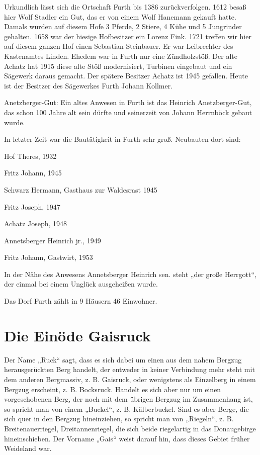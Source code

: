 \documentclass[12pt,a4pager]{book}
\begin{document}
Urkundlich lässt sich die Ortschaft Furth bis 1386 zurückverfolgen. 1612 besaß
hier Wolf Stadler ein Gut, das er von einem Wolf Hanemann gekauft hatte. Damals
wurden auf diesem Hofe 3 Pferde, 2 Stiere, 4 Kühe und 5 Jungrinder gehalten.
1658 war der hiesige Hofbesitzer ein Lorenz Fink. 1721 treffen wir hier auf
diesem ganzen Hof einen Sebastian Steinbauer. Er war Leibrechter des Kastenamtes
Linden. Ehedem war in Furth nur eine Zündholzstöß. Der alte Achatz hat 1915
diese alte Stöß modernisiert, Turbinen eingebaut und ein Sägewerk daraus
gemacht. Der spätere Besitzer Achatz ist 1945 gefallen. Heute ist der Besitzer
des Sägewerkes Furth Johann Kollmer.

Anetzberger-Gut: Ein altes Anwesen in Furth ist das Heinrich Anetzberger-Gut,
das schon 100 Jahre alt sein dürfte und seinerzeit von Johann Herrnböck gebaut
wurde.

In letzter Zeit war die Bautätigkeit in Furth sehr groß. Neubauten dort sind:

Hof Theres, 1932

Fritz Johann, 1945

Schwarz Hermann, Gasthaus zur Waldesrast 1945

Fritz Joseph, 1947

Achatz Joseph, 1948

Annetsberger Heinrich jr., 1949

Fritz Johann, Gastwirt, 1953

In der Nähe des Anwesens Annetsberger Heinrich sen. steht „der große Herrgott“,
der einmal bei einem Unglück ausgeheißen wurde.

Das Dorf Furth zählt in 9 Häusern 46 Einwohner.

\section{Die Einöde Gaisruck}

Der Name „Ruck“ sagt, dass es sich dabei um einen aus dem nahem Bergzug
herausgerückten Berg handelt, der entweder in keiner Verbindung mehr steht mit
dem anderen Bergmassiv, z. B. Gaisruck, oder wenigstens als Einzelberg in einem
Bergzug erscheint, z. B. Bocksruck. Handelt es sich aber nur um einen
vorgeschobenen Berg, der noch mit dem übrigen Bergzug im Zusammenhang ist, so
spricht man von einem „Buckel“, z. B. Kälberbuckel. Sind es aber Berge, die sich
quer in den Bergzug hineinziehen, so spricht man von „Riegeln“, z. B.
Breitenauerriegel, Dreitannenriegel, die sich beide riegelartig in das
Donaugebirge hineinschieben. Der Vorname „Gais“ weist darauf hin, dass dieses
Gebiet früher Weideland war.
\end{document}
